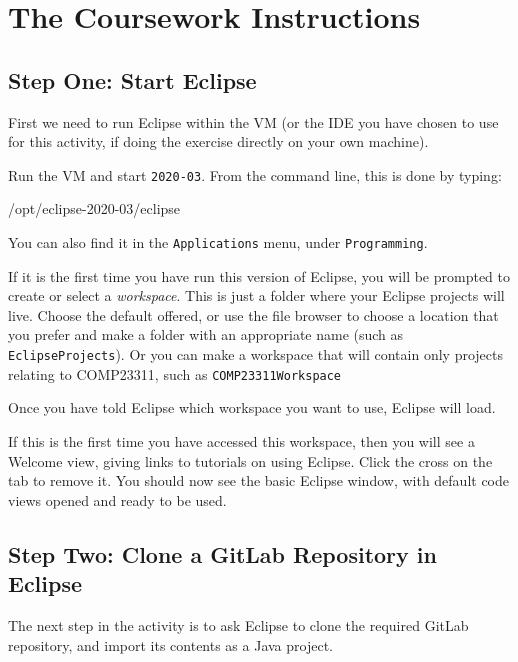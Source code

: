 \documentclass[
]{book}
\newenvironment{Shaded}{\begin{snugshade}}{\end{snugshade}}
\newcommand{\NormalTok}[1]{#1}
\begin{document}
\hypertarget{instructions}{%
\section{The Coursework Instructions}\label{instructions}}

\hypertarget{starteclipse}{%
\subsection{Step One: Start Eclipse}\label{starteclipse}}

First we need to run Eclipse within the VM (or the IDE you have chosen to use for this activity, if doing the exercise directly on your own machine).

Run the VM and start \texttt{2020-03}. From the command line, this is done by typing:

\begin{Shaded}
\begin{Highlighting}[]
\NormalTok{/opt/eclipse{-}2020{-}03/eclipse}
\end{Highlighting}
\end{Shaded}

You can also find it in the \texttt{Applications} menu, under \texttt{Programming}.

If it is the first time you have run this version of Eclipse, you will be prompted to create or select a \emph{workspace}. This is just a folder where your Eclipse projects will live. Choose the default offered, or use the file browser to choose a location that you prefer and make a folder with an appropriate name (such as \texttt{EclipseProjects}). Or you can make a workspace that will contain only projects relating to COMP23311, such as \texttt{COMP23311Workspace}

Once you have told Eclipse which workspace you want to use, Eclipse will load.

If this is the first time you have accessed this workspace, then you will see a Welcome view, giving links to tutorials on using Eclipse. Click the cross on the tab to remove it. You should now see the basic Eclipse window, with default code views opened and ready to be used.

\hypertarget{clone}{%
\subsection{Step Two: Clone a GitLab Repository in Eclipse}\label{clone}}

The next step in the activity is to ask Eclipse to clone the required GitLab repository, and import its contents as a Java project.
\end{document}
